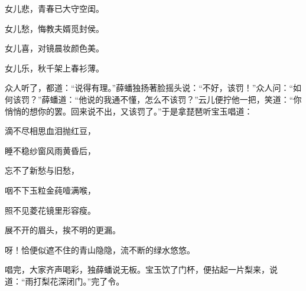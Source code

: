 \begin{poem}

    \begin{pl} 女儿悲，青春已大守空闺。 \end{pl}

    \begin{pl} 女儿愁，悔教夫婿觅封侯。 \end{pl}

    \begin{pl} 女儿喜，对镜晨妆颜色美。 \end{pl}

    \begin{pl} 女儿乐，秋千架上春衫薄。 \end{pl}
\end{poem}

\begin{parag}
    众人听了，都道：“说得有理。”薛蟠独扬著脸摇头说：“不好，该罚！”众人问：“如何该罚？”薛蟠道：“他说的我通不懂，怎么不该罚？”云儿便拧他一把，笑道：“你悄悄的想你的罢。回来说不出，又该罚了。”于是拿琵琶听宝玉唱道：
\end{parag}
\begin{poem}

    \begin{pl}

        滴不尽相思血泪抛红豆，
    \end{pl}
    \begin{pl}

        睡不稳纱窗风雨黄昏后，
    \end{pl}
    \begin{pl}

        忘不了新愁与旧愁，
    \end{pl}
    \begin{pl}

        咽不下玉粒金莼噎满喉，
    \end{pl}
    \begin{pl}

        照不见菱花镜里形容瘦。
    \end{pl}
    \begin{pl}

        展不开的眉头，挨不明的更漏。
    \end{pl}
    \begin{pl}

        呀！恰便似遮不住的青山隐隐，流不断的绿水悠悠。
    \end{pl}
\end{poem}
\begin{parag}
    唱完，大家齐声喝彩，独薛蟠说无板。宝玉饮了门杯，便拈起一片梨来，说道：“雨打梨花深闭门。”完了令。
\end{parag}


